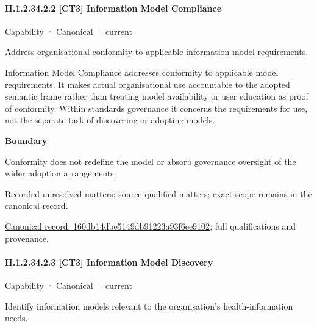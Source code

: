 \paragraph*{II.1.2.34.2.2 [CT3] Information Model Compliance}
\label{navigation:II.1.2.34.2.2}

\label{element:160db14dbe5149db91223a93f6ee9102}
{\small Capability · Canonical · current}\par

Address organisational conformity to applicable information-model requirements.



Information Model Compliance addresses conformity to applicable model requirements. It makes actual organisational use accountable to the adopted semantic frame rather than treating model availability or user education as proof of conformity. Within standards governance it concerns the requirements for use, not the separate task of discovering or adopting models.



\textbf{Boundary}



Conformity does not redefine the model or absorb governance oversight of the wider adoption arrangements.


{\small Recorded unresolved matters: source-qualified matters; exact scope remains in the canonical record.}\par
{\footnotesize \href{../../../../continuum/strategy/capability/160db14dbe5149db91223a93f6ee9102.md}{Canonical record: 160db14dbe5149db91223a93f6ee9102}; full qualifications and provenance.}\par
\paragraph*{II.1.2.34.2.3 [CT3] Information Model Discovery}
\label{navigation:II.1.2.34.2.3}

\label{element:f33dc5b8ba9643329bb7b9431e1f9a6f}
{\small Capability · Canonical · current}\par

Identify information models relevant to the organisation’s health-information needs.



